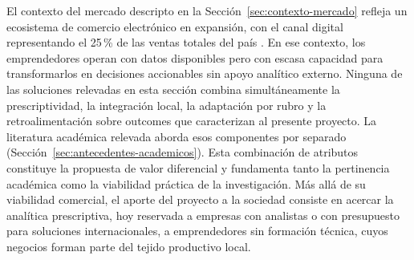 El contexto del mercado descripto en la Sección~\ref{sec:contexto-mercado} refleja un ecosistema de comercio electrónico en expansión, con el canal digital representando el 25\,\% de las ventas totales del país \parencite{CACE2025}. En ese contexto, los emprendedores operan con datos disponibles pero con escasa capacidad para transformarlos en decisiones accionables sin apoyo analítico externo. Ninguna de las soluciones relevadas en esta sección combina simultáneamente la prescriptividad, la integración local, la adaptación por rubro y la retroalimentación sobre outcomes que caracterizan al presente proyecto. La literatura académica relevada aborda esos componentes por separado (Sección~\ref{sec:antecedentes-academicos}). Esta combinación de atributos constituye la propuesta de valor diferencial y fundamenta tanto la pertinencia académica como la viabilidad práctica de la investigación. Más allá de su viabilidad comercial, el aporte del proyecto a la sociedad consiste en acercar la analítica prescriptiva, hoy reservada a empresas con analistas o con presupuesto para soluciones internacionales, a emprendedores sin formación técnica, cuyos negocios forman parte del tejido productivo local.
